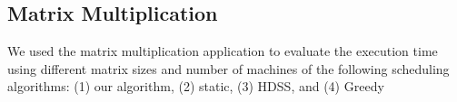 \documentclass[journal]{IEEEtran}
\begin{document}




\subsection{Matrix Multiplication}


We used the matrix multiplication application to evaluate the execution time
using different matrix sizes and number of machines of the following scheduling
algorithms: (1) our algorithm, (2) static, (3) HDSS, and (4) Greedy
\end{document}
